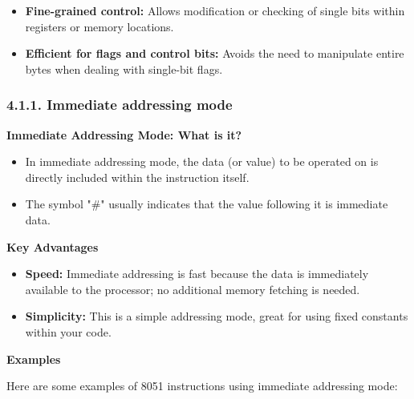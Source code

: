 \documentclass[
]{article}
\begin{document}
\begin{enumerate}
\begin{itemize}
    \begin{itemize}
    \item
      \textbf{Fine-grained control:} Allows modification or checking of
      single bits within registers or memory locations.
    \item
      \textbf{Efficient for flags and control bits:} Avoids the need to
      manipulate entire bytes when dealing with single-bit flags.
    \end{itemize}
  \end{itemize}
\end{enumerate}

\hypertarget{411-immediate-addressing-mode}{%
\subsubsection{4.1.1. Immediate addressing
mode}\label{411-immediate-addressing-mode}}

\textbf{Immediate Addressing Mode: What is it?}

\begin{itemize}
\item
  In immediate addressing mode, the data (or value) to be operated on is
  directly included within the instruction itself.
\item
  The symbol "\#" usually indicates that the value following it is
  immediate data.
\end{itemize}

\textbf{Key Advantages}

\begin{itemize}
\item
  \textbf{Speed:} Immediate addressing is fast because the data is
  immediately available to the processor; no additional memory fetching
  is needed.
\item
  \textbf{Simplicity:} This is a simple addressing mode, great for using
  fixed constants within your code.
\end{itemize}

\textbf{Examples}

Here are some examples of 8051 instructions using immediate addressing
mode:
\end{document}
